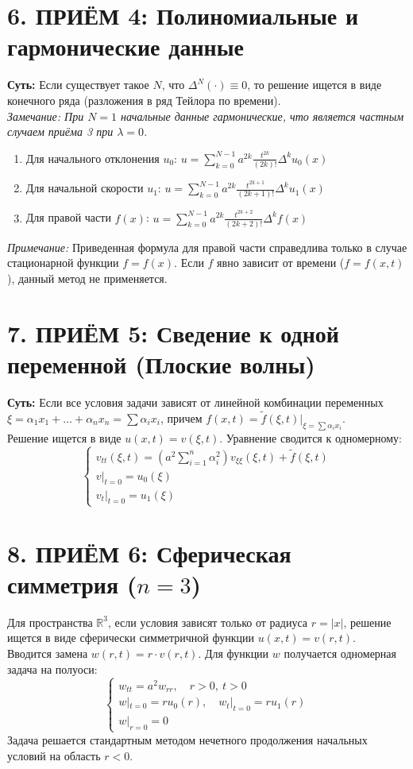 \section{6. ПРИЁМ 4: Полиномиальные и гармонические данные}
\textbf{Суть:} Если существует такое $N$, что $\Delta^N(\cdot) \equiv 0$, то решение ищется в виде конечного ряда (разложения в ряд Тейлора по времени). \\
\textit{Замечание: При $N=1$ начальные данные гармонические, что является частным случаем приёма 3 при $\lambda = 0$.}
\begin{enumerate}
    \setlength{\itemsep}{0pt}
    \item Для начального отклонения $u_0$: \quad $u = \sum_{k=0}^{N-1} a^{2k} \frac{t^{2k}}{(2k)!} \Delta^k u_0(x)$ 
    \item Для начальной скорости $u_1$: \quad $u = \sum_{k=0}^{N-1} a^{2k} \frac{t^{2k+1}}{(2k+1)!} \Delta^k u_1(x)$ 
    \item Для правой части $f(x)$: \quad $u = \sum_{k=0}^{N-1} a^{2k} \frac{t^{2k+2}}{(2k+2)!} \Delta^k f(x)$
\end{enumerate}
\textit{Примечание:} Приведенная формула для правой части справедлива только в случае стационарной функции $f = f(x)$. Если $f$ явно зависит от времени ($f = f(x,t)$), данный метод не применяется.

\section{7. ПРИЁМ 5: Сведение к одной переменной (Плоские волны)}
\textbf{Суть:} Если все условия задачи зависят от линейной комбинации переменных $\xi = \alpha_1 x_1 + \dots + \alpha_n x_n = \sum \alpha_i x_i$, причем $f(x,t) = \tilde{f}(\xi, t)\big|_{\xi = \sum \alpha_i x_i}$. \\
Решение ищется в виде $u(x,t) = v(\xi, t)$. Уравнение сводится к одномерному:
\[ 
\begin{cases}
v_{tt}(\xi,t) = \left( a^2 \sum\limits_{i=1}^n \alpha_i^2 \right) v_{\xi\xi}(\xi,t) + \tilde{f}(\xi, t) \\
v|_{t=0} = u_0(\xi) \\
v_t|_{t=0} = u_1(\xi)
\end{cases}
\]

\section{8. ПРИЁМ 6: Сферическая симметрия ($n=3$)}
Для пространства $\mathbb{R}^3$, если условия зависят только от радиуса $r = |x|$, решение ищется в виде сферически симметричной функции $u(x,t) = v(r, t)$. \\
Вводится замена \textbf{$w(r,t) = r \cdot v(r,t)$}. Для функции $w$ получается одномерная задача на полуоси:
\[ 
\begin{cases} 
w_{tt} = a^2 w_{rr}, \quad r>0, \ t>0 \\ 
w|_{t=0} = r u_0(r), \quad w_t|_{t=0} = r u_1(r) \\ 
w|_{r=0} = 0 
\end{cases} 
\]
Задача решается стандартным методом нечетного продолжения начальных условий на область $r < 0$. 


